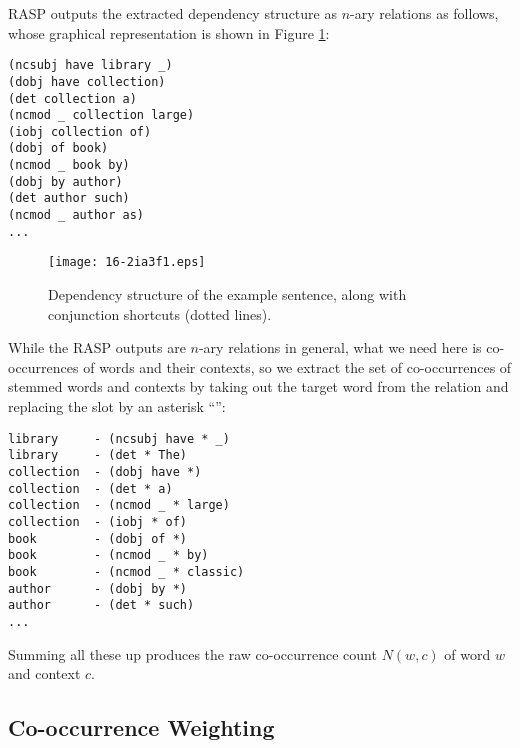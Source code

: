 \documentclass[english]{jnlp_1.4}
\begin{document}
RASP outputs the extracted dependency structure as $n$-ary relations
as follows, whose graphical representation is shown in Figure
\ref{fig_dep_example}:
\begin{verbatim}
(ncsubj have library _)
(dobj have collection)
(det collection a)
(ncmod _ collection large)
(iobj collection of)
(dobj of book)
(ncmod _ book by)
(dobj by author)
(det author such)
(ncmod _ author as)
... 
\end{verbatim}

\begin{figure}[t]
\begin{center}
  \texttt{[image: 16-2ia3f1.eps]}
\end{center}
\caption{Dependency structure of the example sentence, along with conjunction shortcuts (dotted lines).}
\label{fig_dep_example}
\end{figure}

While the RASP outputs are $n$-ary relations in general, what we need
here is co-occurrences of words and their contexts, so we extract the
set of co-occurrences of stemmed words and contexts by taking out the
target word from the relation and replacing the slot by an asterisk
``{\tt *}'':

\begin{verbatim}
library     - (ncsubj have * _)
library     - (det * The)
collection  - (dobj have *)
collection  - (det * a)
collection  - (ncmod _ * large)
collection  - (iobj * of)
book        - (dobj of *)
book        - (ncmod _ * by)
book        - (ncmod _ * classic)
author      - (dobj by *)
author      - (det * such)
...
\end{verbatim}

Summing all these up produces the raw co-occurrence count $N(w, c)$ of
word $w$ and context $c$.


\subsection{Co-occurrence Weighting}
\end{document}
